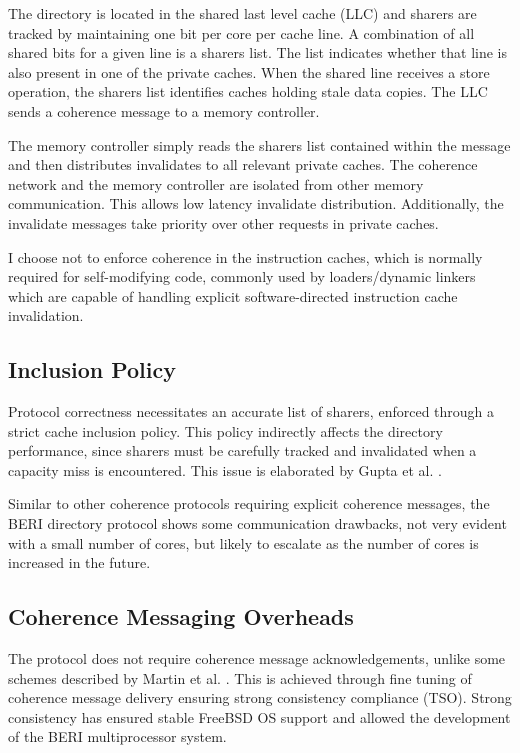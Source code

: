 			The directory is located in the shared last level cache (LLC) and sharers are tracked by maintaining one bit per core per cache line. A combination of all shared bits for a given line is a sharers list. The list indicates whether that line is also present in one of the private caches. When the shared line receives a store operation, the sharers list identifies caches holding stale data copies. The LLC sends a coherence message to a memory controller. 
		
			The memory controller simply reads the sharers list contained within the message and then distributes invalidates to all relevant private caches. The coherence network and the memory controller are isolated from other memory communication. This allows low latency invalidate distribution. Additionally, the invalidate messages take priority over other requests in private caches. 
			
			I choose not to enforce coherence in the instruction caches, which is normally required for self-modifying code, commonly used by loaders/dynamic linkers which are capable of handling explicit software-directed instruction cache invalidation.

		\subsection{Inclusion Policy}
			Protocol correctness necessitates an accurate list of sharers, enforced through a strict cache inclusion policy. This policy indirectly affects the directory performance, since sharers must be carefully tracked and invalidated when a capacity miss is encountered. This issue is elaborated by Gupta et al. \cite{Gupta90}. 
			
			Similar to other coherence protocols requiring explicit coherence messages, the BERI directory protocol shows some communication drawbacks, not very evident with a small number of cores, but likely to escalate as the number of cores is increased in the future. 
	

		\subsection{Coherence Messaging Overheads}
			The protocol does not require coherence message acknowledgements, unlike some schemes described by Martin et al. \cite{Martin12}. This is achieved through fine tuning of coherence message delivery ensuring strong consistency compliance (TSO). Strong consistency has ensured stable FreeBSD OS support and allowed the development of the BERI multiprocessor system.
			
